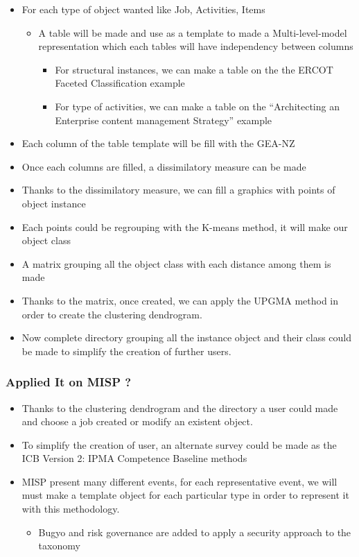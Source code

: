 \documentclass[12pt]{report}
\begin{document}
\begin{itemize}
\item For each type of object wanted like Job, Activities, Items
    \begin{itemize}
    \item A table will be made and use as a template to made a Multi-level-model representation which each tables will have independency between columns
        \begin{itemize}
        \item For structural instances, we can make a table on the the ERCOT Faceted Classification example
        \item For type of activities, we can make a table on the “Architecting an Enterprise content management Strategy” example 
        \end{itemize}
    \end{itemize}
    \item Each column of the table template will be fill with the GEA-NZ 
    \item Once each columns are filled, a dissimilatory measure can be made
    \item Thanks to the dissimilatory measure, we can fill a graphics with points of object instance 
    \item Each points could be regrouping with the K-means method, it will make our object class
    \item A matrix grouping all the object class with each distance among them is made
    \item Thanks to the matrix, once created, we can apply the UPGMA method in order to create the clustering dendrogram.
    \item Now complete directory grouping all the instance object and their class could be made to simplify the creation of further users.

\end{itemize}


\subsubsection*{Applied It on MISP ?}

\begin{itemize}
\item Thanks to the clustering dendrogram and the directory a user could made and choose a job created or modify an existent object.
\item To simplify the creation of user, an alternate survey could be made as the ICB Version 2: IPMA Competence Baseline methods 
\item MISP present many different events, for each representative event, we will must make a template object for each particular type in order to represent it with this methodology.

\begin{itemize}
    \item	Bugyo and risk governance are added to apply a security approach to the taxonomy 
\end{itemize}
\end{itemize}
\end{document}
